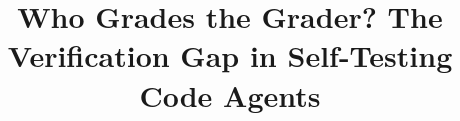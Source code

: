 \documentclass[10pt,conference]{IEEEtran}
\begin{document}
\title{Who Grades the Grader? The Verification Gap in Self-Testing Code Agents}

\maketitle
\begin{abstract}

\end{abstract}

\ifdefined\IncludeFullAppendices\else

\fi


\ifdefined\IncludeFullAppendices
\appendices

\fi
\end{document}
